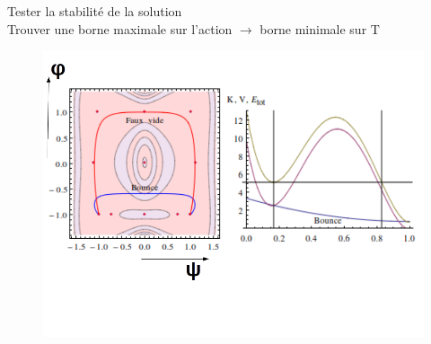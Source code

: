 \documentclass[handout]{beamer}
\newcommand{\Tau}{\mathrm{T}}
\begin{document}
\begin{frame}
Tester la stabilité de la solution\\[0.5 cm]
 Trouver une borne maximale sur l'action $\rightarrow$ borne minimale sur $\Tau$

  \begin{figure}
     \includegraphics[scale=0.35]{ener2.png}
    \end{figure}
%    

    

 
\end{frame}
\end{document}
